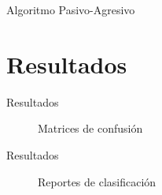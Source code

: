 \documentclass[11pt]{beamer}
\begin{document}
\begin{frame}{Algoritmo Pasivo-Agresivo}
\justifying
\lstI
\end{frame}
	
\section{Resultados}
\begin{frame}{Resultados}
    \begin{figure}%
    \centering
    \qquad
    \caption{Matrices de confusión}%
    \label{fig:example}%
    \end{figure}
\end{frame}

\begin{frame}{Resultados}
    \begin{figure}%
    \centering
    \qquad
    \caption{Reportes de clasificación}%
    \label{fig:example}%
    \end{figure}
\end{frame}
\end{document}
